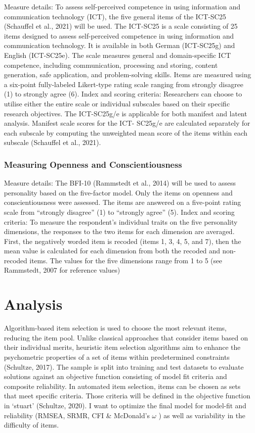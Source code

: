 \documentclass[
  12pt,
  a4paper,
  twoside]{article}
\begin{document}
Measure details: To assess self-perceived competence in using information and
communication technology (ICT), the five general items of the ICT-SC25 (Schauffel
et al., 2021) will be used. The ICT-SC25 is a scale consisting of 25 items designed to
assess self-perceived competence in using information and communication
technology. It is available in both German (ICT-SC25g) and English (ICT-SC25e). The
scale measures general and domain-specific ICT competence, including
communication, processing and storing, content generation, safe application, and
problem-solving skills. Items are measured using a six-point fully-labeled Likert-type
rating scale ranging from strongly disagree (1) to strongly agree (6).
Index and scoring criteria: Researchers can choose to utilise either the entire scale
or individual subscales based on their specific research objectives. The ICT-SC25g/e
is applicable for both manifest and latent analysis. Manifest scale scores for the ICT-
SC25g/e are calculated separately for each subscale by computing the unweighted
mean score of the items within each subscale (Schauffel et al., 2021).

\subsubsection{Measuring Openness and Conscientiousness}\label{measuring-openness-and-conscientiousness}

Measure details: The BFI-10 (Rammstedt et al., 2014) will be used to assess
personality based on the five-factor model. Only the items on openness and
conscientiousness were assessed.
The items are answered on a five-point rating scale from ``strongly disagree'' (1) to
``strongly agree'' (5).
Index and scoring criteria: To measure the respondent's individual traits on the five
personality dimensions, the responses to the two items for each dimension are
averaged. First, the negatively worded item is recoded (items 1, 3, 4, 5, and 7), then
the mean value is calculated for each dimension from both the recoded and non-
recoded items. The values for the five dimensions range from 1 to 5 (see
Rammstedt, 2007 for reference values)

\section{Analysis}\label{analysis}

Algorithm-based item selection is used to choose the most relevant items, reducing the item pool. Unlike classical approaches that consider items based on their individual merits, heuristic item selection algorithms aim to enhance the psychometric properties of a set of items within predetermined constraints (Schultze, 2017). The sample is split into training and test datasets to evaluate solutions against an objective function consisting of model fit criteria and composite reliability. In automated item selection, items can be chosen as sets that meet specific criteria. Those criteria will be defined in the objective function in `stuart' (Schultze, 2020). I want to optimize the final model for model-fit and reliability (RMSEA, SRMR, CFI \& McDonald's \(\omega\) ) as well as variability in the difficulty of items.
\end{document}
